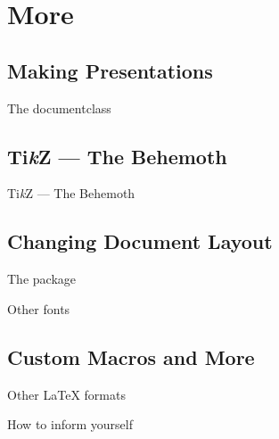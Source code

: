 \section{More}

\subsection{Making Presentations}
\begin{frame}{The  documentclass}

\end{frame}

\subsection{Ti\textit{k}Z --- The Behemoth}
\begin{frame}{Ti\textit{k}Z --- The Behemoth}

\end{frame}

\subsection{Changing Document Layout}
\begin{frame}{The  package}

\end{frame}

\begin{frame}{Other fonts}

\end{frame}

\subsection{Custom Macros and More}
\begin{frame}

\end{frame}

\begin{frame}{Other \LaTeX{} formats}

\end{frame}

\begin{frame}{How to inform yourself}

\end{frame}
